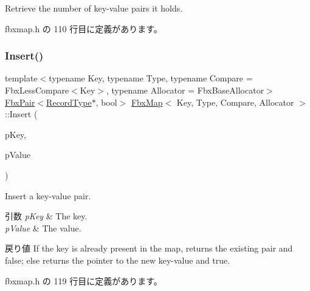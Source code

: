 Retrieve the number of key-\/value pairs it holds. 



 fbxmap.\+h の 110 行目に定義があります。

\mbox{\label{class_fbx_map_a520c1d971dfe2401aa3d9824a0344ce4}} 
\subsubsection{\texorpdfstring{Insert()}{Insert()}}
{\footnotesize\ttfamily template$<$typename Key, typename Type, typename Compare = Fbx\+Less\+Compare$<$\+Key$>$, typename Allocator = Fbx\+Base\+Allocator$>$ \\
\hyperlink{class_fbx_pair}{Fbx\+Pair}$<$\hyperlink{class_fbx_map_af8fc887461b3bf29f41aa36d15ddb54f}{Record\+Type}$\ast$, bool$>$ \hyperlink{class_fbx_map}{Fbx\+Map}$<$ Key, Type, Compare, Allocator $>$\+::Insert (\begin{DoxyParamCaption}\item[{const \hyperlink{class_fbx_map_ad8392c83b6f8eeb9e0706bcc8674270a}{Key\+Type} \&}]{p\+Key,  }\item[{const \hyperlink{class_fbx_map_abea530b1192b31c3cf05fbf247e3dcaa}{Value\+Type} \&}]{p\+Value }\end{DoxyParamCaption})\hspace{0.3cm}{\ttfamily [inline]}}

Insert a key-\/value pair. 
\begin{DoxyParams}{引数}
{\em p\+Key} & The key. \\
\hline
{\em p\+Value} & The value. \\
\hline
\end{DoxyParams}
\begin{DoxyReturn}{戻り値}
If the key is already present in the map, returns the existing pair and false; else returns the pointer to the new key-\/value and true. 
\end{DoxyReturn}


 fbxmap.\+h の 119 行目に定義があります。

\mbox{\label{class_fbx_map_af27d42885327b837114b1c51373be612}} 
